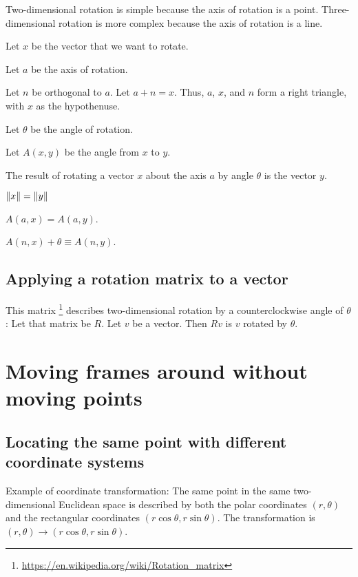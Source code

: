 Two-dimensional rotation is simple because the axis of rotation is a point.
Three-dimensional rotation is more complex because the axis of rotation is a line.

Let \(x\) be the vector that we want to rotate.

Let \(a\) be the axis of rotation.

Let \(n\) be orthogonal to \(a\).
Let \(a + n = x\).
Thus, \(a\), \(x\), and \(n\) form a right triangle, with \(x\) as the hypothenuse.

Let \(\theta\) be the angle of rotation.

Let \(A(x,y)\) be the angle from \(x\) to \(y\).

The result of rotating a vector \(x\) about the axis \(a\) by angle \(\theta\) is the vector \(y\).

\(\norm{x} = \norm{y}\)

\(A(a,x) = A(a,y)\).

\(A(n,x) + \theta \equiv A(n,y)\).

\subsection{Applying a rotation matrix to a vector}

This matrix%
\footnote{\url{https://en.wikipedia.org/wiki/Rotation_matrix}}
describes
two-dimensional rotation by a counterclockwise angle of \(\theta\):
Let that matrix be \(R\).
Let \(v\) be a vector.
Then \(Rv\) is \(v\) rotated by \(\theta\).

\section{Moving frames around without moving points}

\subsection{Locating the same point with different coordinate systems}

Example of coordinate transformation:
The same point in the same two-dimensional Euclidean space
is described by
both the polar coordinates \( (r,\theta) \)
and the rectangular coordinates \( (r \cos \theta, r \sin \theta) \).
The transformation is \( (r,\theta) \to (r \cos \theta, r \sin \theta) \).

